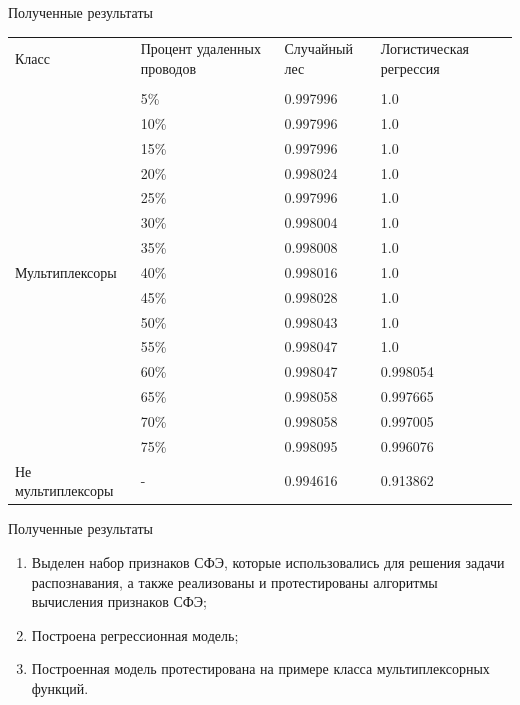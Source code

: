 \documentclass[serif,utf8]{beamer}
\begin{document}
\begin{frame}{Полученные результаты}
\scriptsize{
\begin{table}[h!]
\begin{tabular}[t]{|p{8em}|p{6em}|p{6em}|p{7em}|}
\hline 
	{Класс} & { Процент удаленных проводов} & { Случайный лес } & { Логистическая регрессия }\\
	{} & {  } & { } & { }\\
\hline
\hline
\hline
	\multirow{15}{*}{Мультиплексоры} 
		& {5\%}  & {0.997996} & {1.0}\\ \cline{2-4}
		& {10\%} & {0.997996} & {1.0}\\ \cline{2-4}
		& {15\%} & {0.997996} & {1.0}\\ \cline{2-4}
		& {20\%} & {0.998024} & {1.0}\\ \cline{2-4}
		& {25\%} & {0.997996} & {1.0}\\ \cline{2-4}
		& {30\%} & {0.998004} & {1.0}\\ \cline{2-4}
		& {35\%} & {0.998008} & {1.0}\\ \cline{2-4}
		& {40\%} & {0.998016} & {1.0}\\ \cline{2-4}
		& {45\%} & {0.998028} & {1.0}\\ \cline{2-4}
		& {50\%} & {0.998043} & {1.0}\\ \cline{2-4}
		& {55\%} & {0.998047} & {1.0}\\ \cline{2-4}
		& {60\%} & {0.998047} & {0.998054}\\ \cline{2-4}
		& {65\%} & {0.998058} & {0.997665}\\ \cline{2-4}
		& {70\%} & {0.998058} & {0.997005}\\ \cline{2-4}
		& {75\%} & {0.998095} & {0.996076}\\
\hline
\hline
	{Не мультиплексоры} & { - } & {0.994616} & {0.913862}\\ \cline{1-4}
\hline
\end{tabular}
\end{table}
}
\end{frame}


\begin{frame}{Полученные результаты}
\begin{enumerate}
[default]
\item Выделен набор признаков СФЭ, которые использовались для решения задачи распознавания, а также реализованы и протестированы алгоритмы вычисления признаков СФЭ;
\item Построена регрессионная модель;
\item Построенная модель протестирована на примере класса мультиплексорных функций. 
\end{enumerate}
\end{frame}

\begin{frame}
\maketitle
\end{frame}
\end{document}
